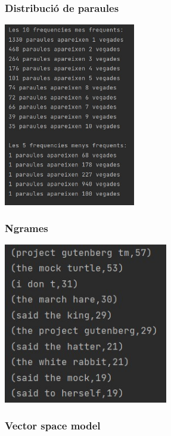 \documentclass[11pt,a4paper]{article}
\begin{document}
		\subsubsection{Distribució de paraules}
		
			\begin{center}
				\includegraphics[height=8cm]{captures/primeraPart/distribucioParaules/execucio.jpg}
			\end{center}
		
		\subsubsection{Ngrames}
		
			\begin{center}
				\includegraphics[height=7cm]{captures/primeraPart/ngrames/execucio.jpg}
			\end{center}
		
		\subsubsection{Vector space model}
		
\end{document}
